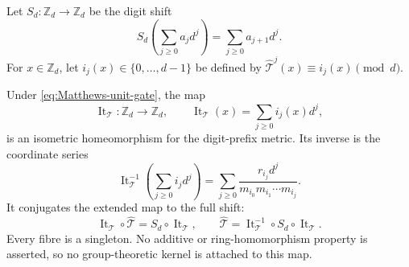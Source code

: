 Let $S_d:\mathbb Z_d\to\mathbb Z_d$ be the digit shift
\[
 S_d\!\left(\sum_{j\geq0}a_jd^j\right)=
 \sum_{j\geq0}a_{j+1}d^j.
\]
For $x\in\mathbb Z_d$, let $i_j(x)\in\{0,\ldots,d-1\}$ be defined by
$\widehat{\mathcal T}^{j}(x)\equiv i_j(x)\pmod d$.

\begin{theorem}
\label{thm:general-d-itinerary-conjugacy}
Under \eqref{eq:Matthews-unit-gate}, the map
\begin{equation}
\label{eq:general-itinerary-encoder}
 \operatorname{It}_{\mathcal T}:\mathbb Z_d\longrightarrow\mathbb Z_d,
 \qquad
 \operatorname{It}_{\mathcal T}(x)=\sum_{j\geq0}i_j(x)d^j,
\end{equation}
is an isometric homeomorphism for the digit-prefix metric.  Its inverse is the
coordinate series
\begin{equation}
\label{eq:general-itinerary-inverse}
 \operatorname{It}_{\mathcal T}^{-1}
 \!\left(\sum_{j\geq0}i_jd^j\right)
 =\sum_{j\geq0}
 \frac{r_{i_j}d^j}{m_{i_0}m_{i_1}\cdots m_{i_j}}.
\end{equation}
It conjugates the extended map to the full shift:
\begin{equation}
\label{eq:general-itinerary-conjugacy}
 \operatorname{It}_{\mathcal T}\circ\widehat{\mathcal T}
 =S_d\circ\operatorname{It}_{\mathcal T},
 \qquad
 \widehat{\mathcal T}
 =\operatorname{It}_{\mathcal T}^{-1}
  \circ S_d\circ\operatorname{It}_{\mathcal T}.
\end{equation}
Every fibre is a singleton.  No additive or ring-homomorphism property is
asserted, so no group-theoretic kernel is attached to this map.
\end{theorem}

